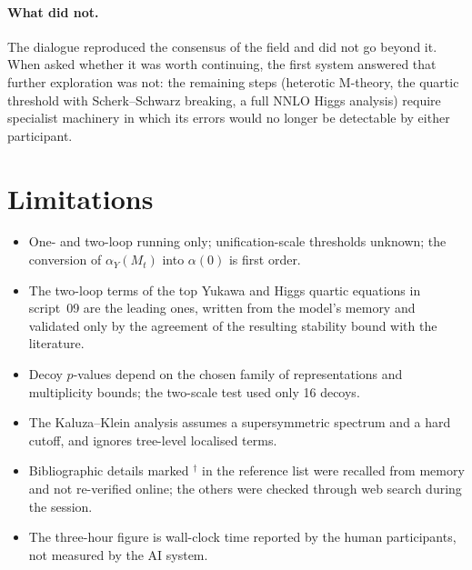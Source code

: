 \documentclass[11pt,a4paper]{article}
\begin{document}
\paragraph{What did not.} The dialogue reproduced the consensus of the field and did not go beyond it. When asked whether it
was worth continuing, the first system answered that further exploration was not: the remaining steps (heterotic M-theory, the
quartic threshold with Scherk--Schwarz breaking, a full NNLO Higgs analysis) require specialist machinery in which its errors
would no longer be detectable by either participant.

\section{Limitations}\label{sec:limits}
\begin{itemize}\itemsep1pt
\item One- and two-loop running only; unification-scale thresholds unknown; the conversion of $\alpha_Y(M_t)$ into $\alpha(0)$
is first order.
\item The two-loop terms of the top Yukawa and Higgs quartic equations in script~09 are the leading ones, written from the
model's memory and validated only by the agreement of the resulting stability bound with the literature.
\item Decoy $p$-values depend on the chosen family of representations and multiplicity bounds; the two-scale test used only 16 decoys.
\item The Kaluza--Klein analysis assumes a supersymmetric spectrum and a hard cutoff, and ignores tree-level localised terms.
\item Bibliographic details marked $^\dagger$ in the reference list were recalled from memory and not re-verified online; the
others were checked through web search during the session.
\item The three-hour figure is wall-clock time reported by the human participants, not measured by the AI system.
\end{itemize}

\end{document}
